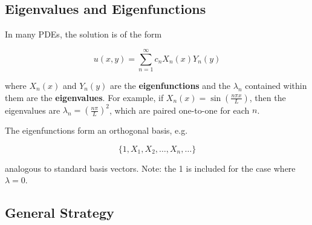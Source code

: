 \subsection{Eigenvalues and Eigenfunctions}

In many PDEs, the solution is of the form

\begin{equation*}
    u(x, y) = \sum_{n=1}^{\infty} c_n X_n(x)Y_n(y)
\end{equation*}

where $X_n(x)$ and $Y_n(y)$ are the \textbf{eigenfunctions} and the $\lambda_n$ contained within them are the \textbf{eigenvalues}. For example, if $X_n(x) = \sin(\frac{n\pi x}{L})$, then the eigenvalues are $\lambda_n = (\frac{n\pi}{L})^2$, which are paired one-to-one for each $n$.

\vsp

The eigenfunctions form an orthogonal basis, e.g.

\begin{equation*}
    \{1, X_1, X_2, \dots, X_n, \dots\}
\end{equation*}

analogous to standard basis vectors. Note: the 1 is included for the case where $\lambda = 0$.

\subsection{General Strategy}

